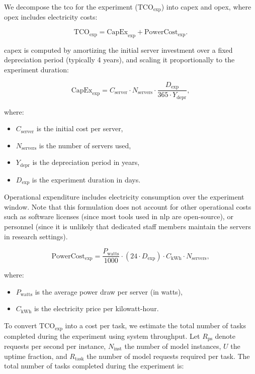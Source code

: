 We decompose the \ac{tco} for the experiment ($\text{TCO}_{\text{exp}}$) into \ac{capex} and \ac{opex}, where \ac{opex} includes electricity costs:

\[
\text{TCO}_{\text{exp}} = \text{CapEx}_{\text{exp}} + \text{PowerCost}_{\text{exp}}.
\]

\ac{capex} is computed by amortizing the initial server investment over a fixed depreciation period (typically 4 years), and scaling it proportionally to the experiment duration:

\[
\text{CapEx}_{\text{exp}} =
C_{\text{server}} \cdot N_{\text{servers}}
\cdot
\frac{D_{\text{exp}}}{365 \cdot Y_{\text{depr}}},
\]

\noindent where:
\begin{itemize}
	\item $C_{\text{server}}$ is the initial cost per server,
	\item $N_{\text{servers}}$ is the number of servers used,
	\item $Y_{\text{depr}}$ is the depreciation period in years,
	\item $D_{\text{exp}}$ is the experiment duration in days.
\end{itemize}

Operational expenditure includes electricity consumption over the experiment window. Note that this formulation does not account for other operational costs such as software licenses (since most tools used in \ac{nlp} are open-source), or personnel (since it is unlikely that dedicated staff members maintain the servers in research settings).

\[
\text{PowerCost}_{\text{exp}} =
\frac{P_{\text{watts}}}{1000}
\cdot (24 \cdot D_{\text{exp}})
\cdot C_{\text{kWh}}
\cdot N_{\text{servers}},
\]

\noindent where:
\begin{itemize}
	\item $P_{\text{watts}}$ is the average power draw per server (in watts),
	\item $C_{\text{kWh}}$ is the electricity price per kilowatt-hour.
\end{itemize}

To convert $\text{TCO}_{\text{exp}}$ into a cost per task, we estimate the total number of tasks completed during the experiment using system throughput. Let $R_{\text{ps}}$ denote requests per second per instance, $N_{\text{inst}}$ the number of model instances, $U$ the uptime fraction, and $R_{\text{task}}$ the number of model requests required per task. The total number of tasks completed during the experiment is:

